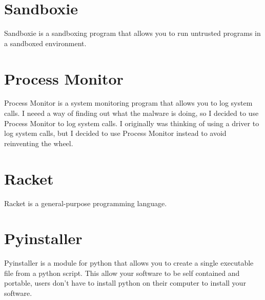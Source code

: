 \section{Sandboxie}
Sandboxie is a sandboxing program that allows you to run untrusted programs in a sandboxed environment.

\section{Process Monitor}
Process Monitor is a system monitoring program that allows you to log system calls.
I neeed a way of finding out what the malware is doing, so I decided to use Process Monitor to log system calls.
I originally was thinking of using a driver to log system calls, but I decided to use Process Monitor instead to avoid reinventing the wheel.

\section{Racket}
Racket is a general-purpose programming language.

\section{Pyinstaller}
Pyinstaller is a module for python that allows you to create a single executable file from a python script.
This allow your software to be self contained and portable, users don't have to install python on their computer to install your software.

